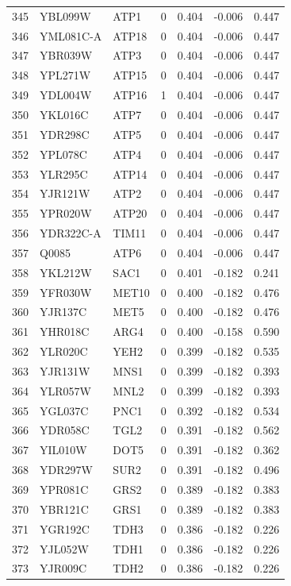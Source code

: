 \begin{longtable}{rllrrrr}
345 & YBL099W & ATP1 & 0 & 0.404 & -0.006 & 0.447\\
346 & YML081C-A & ATP18 & 0 & 0.404 & -0.006 & 0.447\\
347 & YBR039W & ATP3 & 0 & 0.404 & -0.006 & 0.447\\
348 & YPL271W & ATP15 & 0 & 0.404 & -0.006 & 0.447\\
349 & YDL004W & ATP16 & 1 & 0.404 & -0.006 & 0.447\\
350 & YKL016C & ATP7 & 0 & 0.404 & -0.006 & 0.447\\
351 & YDR298C & ATP5 & 0 & 0.404 & -0.006 & 0.447\\
352 & YPL078C & ATP4 & 0 & 0.404 & -0.006 & 0.447\\
353 & YLR295C & ATP14 & 0 & 0.404 & -0.006 & 0.447\\
354 & YJR121W & ATP2 & 0 & 0.404 & -0.006 & 0.447\\
355 & YPR020W & ATP20 & 0 & 0.404 & -0.006 & 0.447\\
356 & YDR322C-A & TIM11 & 0 & 0.404 & -0.006 & 0.447\\
357 & Q0085 & ATP6 & 0 & 0.404 & -0.006 & 0.447\\
358 & YKL212W & SAC1 & 0 & 0.401 & -0.182 & 0.241\\
359 & YFR030W & MET10 & 0 & 0.400 & -0.182 & 0.476\\
360 & YJR137C & MET5 & 0 & 0.400 & -0.182 & 0.476\\
361 & YHR018C & ARG4 & 0 & 0.400 & -0.158 & 0.590\\
362 & YLR020C & YEH2 & 0 & 0.399 & -0.182 & 0.535\\
363 & YJR131W & MNS1 & 0 & 0.399 & -0.182 & 0.393\\
364 & YLR057W & MNL2 & 0 & 0.399 & -0.182 & 0.393\\
365 & YGL037C & PNC1 & 0 & 0.392 & -0.182 & 0.534\\
366 & YDR058C & TGL2 & 0 & 0.391 & -0.182 & 0.562\\
367 & YIL010W & DOT5 & 0 & 0.391 & -0.182 & 0.362\\
368 & YDR297W & SUR2 & 0 & 0.391 & -0.182 & 0.496\\
369 & YPR081C & GRS2 & 0 & 0.389 & -0.182 & 0.383\\
370 & YBR121C & GRS1 & 0 & 0.389 & -0.182 & 0.383\\
371 & YGR192C & TDH3 & 0 & 0.386 & -0.182 & 0.226\\
372 & YJL052W & TDH1 & 0 & 0.386 & -0.182 & 0.226\\
373 & YJR009C & TDH2 & 0 & 0.386 & -0.182 & 0.226\\

\end{longtable}
